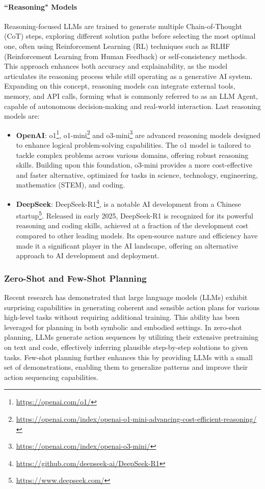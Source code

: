 \paragraph{``Reasoning" Models}
Reasoning-focused LLMs are trained to generate multiple Chain-of-Thought (CoT) steps,
exploring different solution paths before selecting the most optimal one, often using
Reinforcement Learning (RL) \cite{deepseekai2025deepseekr1incentivizingreasoningcapability}
techniques such as RLHF (Reinforcement Learning from Human Feedback) or self-consistency
methods. This approach enhances both accuracy and explainability, as the model articulates
its reasoning process while still operating as a generative AI system. Expanding
on this concept, reasoning models can integrate external tools, memory, and API calls,
forming what is commonly referred to as an LLM Agent, capable of autonomous decision-making
and real-world interaction. Last reasoning models are:
\begin{itemize}
  \item \textbf{OpenAI}: o1\footnote{\url{https://openai.com/o1/}}, o1-mini\footnote{\url{https://openai.com/index/openai-o1-mini-advancing-cost-efficient-reasoning/}}
    and o3-mini\footnote{\url{https://openai.com/index/openai-o3-mini/}} are advanced
    reasoning models designed to enhance logical problem-solving capabilities.
    The o1 model is tailored to tackle complex problems across various domains, offering
    robust reasoning skills. Building upon this foundation, o3-mini provides a more
    cost-effective and faster alternative, optimized for tasks in science, technology,
    engineering, mathematics (STEM), and coding.

  \item \textbf{DeepSeek}: DeepSeek-R1\footnote{\url{https://github.com/deepseek-ai/DeepSeek-R1}},
    is a notable AI development from a Chinese startup\footnote{\url{https://www.deepseek.com/}}.
    Released in early 2025, DeepSeek-R1 is recognized for its powerful reasoning
    and coding skills, achieved at a fraction of the development cost compared to
    other leading models. Its open-source nature and efficiency have made it a
    significant player in the AI landscape, offering an alternative approach to AI
    development and deployment.
\end{itemize}

\subsubsection{Zero-Shot and Few-Shot Planning}
Recent research has demonstrated that large language models (LLMs) exhibit
surprising capabilities in generating coherent and sensible action plans for
various high-level tasks without requiring additional training. This ability has
been leveraged for planning in both symbolic and embodied settings. In zero-shot
planning, LLMs generate action sequences by utilizing their extensive pretraining
on text and code, effectively inferring plausible step-by-step solutions to
given tasks. Few-shot planning further enhances this by providing LLMs with a small
set of demonstrations, enabling them to generalize patterns and improve their
action sequencing capabilities.

